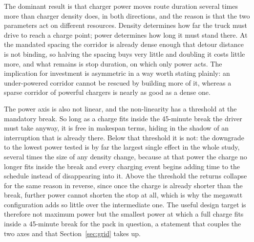 The dominant result is that charger power moves route duration several times more than charger density does, in both directions, and the reason is that the two parameters act on different resources. Density determines how far the truck must drive to reach a charge point; power determines how long it must stand there. At the mandated spacing the corridor is already dense enough that detour distance is not binding, so halving the spacing buys very little and doubling it costs little more, and what remains is stop duration, on which only power acts. The implication for investment is asymmetric in a way worth stating plainly: an under-powered corridor cannot be rescued by building more of it, whereas a sparse corridor of powerful chargers is nearly as good as a dense one.

The power axis is also not linear, and the non-linearity has a threshold at the mandatory break. So long as a charge fits inside the 45-minute break the driver must take anyway, it is free in makespan terms, hiding in the shadow of an interruption that is already there. Below that threshold it is not: the downgrade to the lowest power tested is by far the largest single effect in the whole study, several times the size of any density change, because at that power the charge no longer fits inside the break and every charging event begins adding time to the schedule instead of disappearing into it. Above the threshold the returns collapse for the same reason in reverse, since once the charge is already shorter than the break, further power cannot shorten the stop at all, which is why the megawatt configuration adds so little over the intermediate one. The useful design target is therefore not maximum power but the smallest power at which a full charge fits inside a 45-minute break for the pack in question, a statement that couples the two axes and that Section~\ref{sec:grid} takes up.

